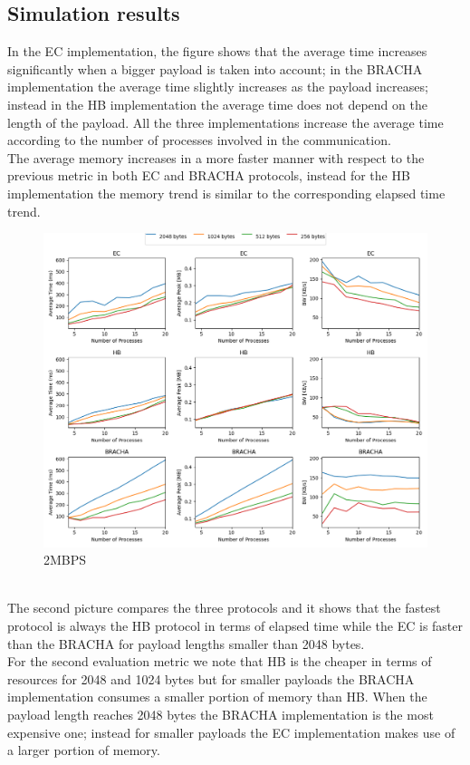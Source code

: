 \documentclass[12pt]{article}
\begin{document}
\subsection{Simulation results}
In the EC implementation, the figure shows that the average time increases significantly when a bigger payload is taken into account; in the BRACHA implementation the average time slightly increases as the payload increases; instead in the HB implementation the average time does not depend on the length of the payload. All the three implementations increase the average time according to the number of processes involved in the communication.\\
The average memory increases in a more faster manner with respect to the previous metric in both EC and BRACHA protocols, instead for the HB implementation the memory trend is similar to the corresponding elapsed time trend.\\
\begin{figure}
\centering
\includegraphics[scale=0.4]{LINE-GRAPH-3FINAL-2MBPS.png}
\caption{2MBPS}
\label{fig:mesh1}
\end{figure}
\\
The second picture compares the three protocols and it shows that the fastest protocol is always the HB protocol in terms of elapsed time while the EC is faster than the BRACHA for payload lengths smaller than 2048 bytes.\\
For the second evaluation metric we note that HB is the cheaper in terms of resources for 2048 and 1024 bytes but for smaller payloads the BRACHA implementation consumes a smaller portion of memory than HB. When the payload length reaches 2048 bytes the BRACHA implementation is the most expensive one; instead for smaller payloads the EC implementation makes use of a larger portion of memory.\\
\end{document}
